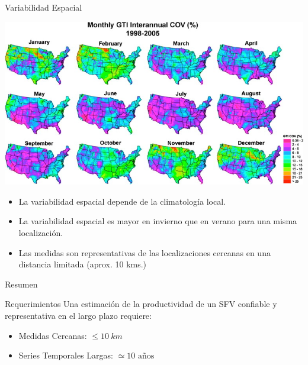 \documentclass[xcolor={usenames,svgnames,dvipsnames}]{beamer}
\begin{document}
\begin{frame}[label={sec:orgb14a5fb}]{Variabilidad Espacial}
\begin{center}
\includegraphics[height=0.4\textheight]{../figs/SpatialVariability.jpg}
\end{center}

\begin{itemize}
\item La variabilidad espacial depende de la \alert{climatología local}.
\item La variabilidad espacial es \alert{mayor en invierno que en verano} para una misma localización.
\item Las medidas son representativas de las localizaciones cercanas en una distancia limitada (aprox. 10 kms.)
\end{itemize}
\end{frame}

\begin{frame}[label={sec:org29f0cd7}]{Resumen}
\begin{block}{Requerimientos}
Una estimación de la productividad de un SFV confiable y representativa en el largo plazo requiere:
\begin{itemize}
\item \alert{Medidas Cercanas}: \(\leq \SI{10}{km}\)
\item \alert{Series Temporales Largas}: \(\simeq 10 \text{ años}\)
\end{itemize}
\end{block}
\end{frame}
\end{document}
